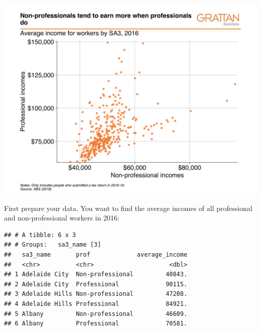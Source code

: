 \documentclass[]{book}
\newenvironment{Shaded}{\begin{snugshade}}{\end{snugshade}}
\newcommand{\DataTypeTok}[1]{\textcolor[rgb]{0.13,0.29,0.53}{#1}}
\newcommand{\DecValTok}[1]{\textcolor[rgb]{0.00,0.00,0.81}{#1}}
\newcommand{\KeywordTok}[1]{\textcolor[rgb]{0.13,0.29,0.53}{\textbf{#1}}}
\newcommand{\NormalTok}[1]{#1}
\newcommand{\OperatorTok}[1]{\textcolor[rgb]{0.81,0.36,0.00}{\textbf{#1}}}
\newcommand{\StringTok}[1]{\textcolor[rgb]{0.31,0.60,0.02}{#1}}
\begin{document}
\includegraphics[width=44.44in]{atlas/scatter_reshape}

First prepare your data. You want to find the average incomes of all professional and non-professional workers in 2016:

\begin{Shaded}
\end{Shaded}

\begin{verbatim}
## # A tibble: 6 x 3
## # Groups:   sa3_name [3]
##   sa3_name       prof             average_income
##   <chr>          <chr>                     <dbl>
## 1 Adelaide City  Non-professional         40843.
## 2 Adelaide City  Professional             90115.
## 3 Adelaide Hills Non-professional         47208.
## 4 Adelaide Hills Professional             84921.
## 5 Albany         Non-professional         46609.
## 6 Albany         Professional             70581.
\end{verbatim}
\end{document}
